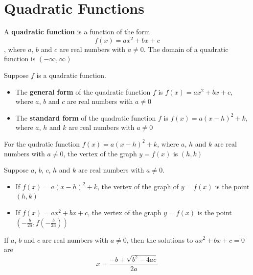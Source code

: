 \section{Quadratic Functions}

\begin{definition}
    A \textbf{quadratic function} is a function of the form
    \[f(x) = ax^2 + bx + c\],
    where $a$, $b$ and $c$ are real numbers with $a \neq 0$. The domain of a quadratic function is $(-\infty, \infty)$
\end{definition}

\begin{definition}
    Suppose $f$ is a quadratic function.
    \begin{itemize}
        \item The \textbf{general form} of the quadratic function $f$ is $f(x) = ax^2 + bx + c$, where $a$, $b$ and $c$ are real numbers with $a \neq 0$
        \item The \textbf{standard form} of the quadratic function $f$ is $f(x)=a(x-h)^2 + k$, where $a$, $h$ and $k$ are real numbers with $a \neq 0$
    \end{itemize}
\end{definition}

\begin{definition}
    For the qudratic function $f(x) = a(x-h)^2 + k$, where $a$, $h$ and $k$ are real numbers with $a \neq 0$, the vertex of the graph $y=f(x)$ is $(h,k)$
\end{definition}

\begin{definition}
    Suppose $a$, $b$, $c$, $h$ and $k$ are real numbers with $a \neq 0$.
    \begin{itemize}
        \item If $f(x)=a(x-h)^2 + k$, the vertex of the graph of $y=f(x)$ is the point $(h,k)$
        \item If $f(x)=ax^2+bx+c$, the vertex of the graph $y=f(x)$ is the point $(-\frac{b}{2a}, f(-\frac{b}{2a}))$
    \end{itemize}
\end{definition}

\begin{definition}
    If $a$, $b$ and $c$ are real numbers with $a \neq 0$, then the solutions to $ax^2 + bx + c = 0$ are
    \[
        x = \frac{-b \pm \sqrt{b^2 - 4ac}}{2a}
    \]
\end{definition}

